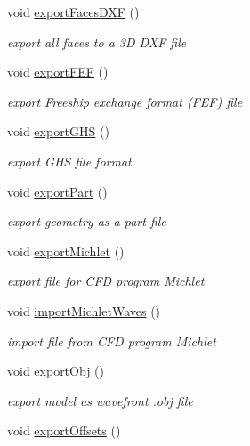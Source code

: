 \begin{DoxyCompactItemize}
\item 
void \hyperlink{classShipCAD_1_1Controller_aa663e1b23df9ee100def2c4ddd7cd125}{export\-Faces\-D\-X\-F} ()
\begin{DoxyCompactList}\small\item\em export all faces to a 3\-D D\-X\-F file \end{DoxyCompactList}\item 
void \hyperlink{classShipCAD_1_1Controller_a6041d09e04e4360dd21c9cce963ee6e2}{export\-F\-E\-F} ()
\begin{DoxyCompactList}\small\item\em export Freeship exchange format (F\-E\-F) file \end{DoxyCompactList}\item 
void \hyperlink{classShipCAD_1_1Controller_a00b524f96361a01e0241ffc2b23c60cc}{export\-G\-H\-S} ()
\begin{DoxyCompactList}\small\item\em export G\-H\-S file format \end{DoxyCompactList}\item 
void \hyperlink{classShipCAD_1_1Controller_adae36d18959625b2902bd8ac66b6faaa}{export\-Part} ()
\begin{DoxyCompactList}\small\item\em export geometry as a part file \end{DoxyCompactList}\item 
void \hyperlink{classShipCAD_1_1Controller_af86e9dc7208c8ffcacfae13ce3eae2c8}{export\-Michlet} ()
\begin{DoxyCompactList}\small\item\em export file for C\-F\-D program Michlet \end{DoxyCompactList}\item 
void \hyperlink{classShipCAD_1_1Controller_a9f2572c18a3e6adee8b36d65d0f4d0e8}{import\-Michlet\-Waves} ()
\begin{DoxyCompactList}\small\item\em import file from C\-F\-D program Michlet \end{DoxyCompactList}\item 
void \hyperlink{classShipCAD_1_1Controller_aedec5d6b6975369449ad85015fdf356b}{export\-Obj} ()
\begin{DoxyCompactList}\small\item\em export model as wavefront .obj file \end{DoxyCompactList}\item 
void \hyperlink{classShipCAD_1_1Controller_aaa421c35fc4e7b567123810ac7982747}{export\-Offsets} ()

\end{DoxyCompactItemize}
